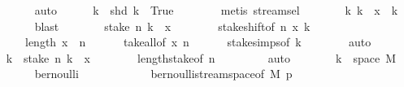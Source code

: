 \begin{isabellebody}
\ \ \ \ \ \ \isamarkupfalse%
\ auto\isanewline
\ \ \ \ \isamarkupfalse%
\ k\ \ {\isachardoublequoteopen}shd\ k\ {\isacharequal}{\kern0pt}\ True{\isachardoublequoteclose}\isanewline
\ \ \ \ \ \ \isamarkupfalse%
\ {\isacharparenleft}{\kern0pt}metis\ stream{\isachardot}{\kern0pt}sel{\isacharparenleft}{\kern0pt}{}{\isacharparenright}{\kern0pt}{\isacharparenright}{\kern0pt}\isanewline
\ \ \ \ \isamarkupfalse%
\ \isamarkupfalse%
\ k{}\ k{}\ {\isacharequal}{\kern0pt}\ x\ {\isacharat}{\kern0pt}{\isacharminus}{\kern0pt}\ k{\isachardoublequoteclose}\isanewline
\ \ \ \ \ \ \isamarkupfalse%
\ blast\isanewline
\ \ \ \ \isamarkupfalse%
\ \isamarkupfalse%
\ {\isachardoublequoteopen}stake\ n\ k{}\ {\isacharequal}{\kern0pt}\ x{\isachardoublequoteclose}\isanewline
\ \ \ \ \ \ \isamarkupfalse%
\ stake{\isacharunderscore}{\kern0pt}shift{\isacharbrackleft}{\kern0pt}of\ n\ x\ k{\isacharbrackright}{\kern0pt}\isanewline
\ \ \ \ \ \ {\isacartoucheopen}length\ x\ {\isacharequal}{\kern0pt}\ n{\isacartoucheclose}\isanewline
\ \ \ \ \ \ take{\isacharunderscore}{\kern0pt}all{\isacharbrackleft}{\kern0pt}of\ x\ n{\isacharbrackright}{\kern0pt}\isanewline
\ \ \ \ \ \ stake{\isachardot}{\kern0pt}simps{\isacharparenleft}{\kern0pt}{}{\isacharparenright}{\kern0pt}{\isacharbrackleft}{\kern0pt}of\ k{\isacharbrackright}{\kern0pt}\isanewline
\ \ \ \ \ \ \isamarkupfalse%
\ auto\isanewline
\ \ \ \ \isamarkupfalse%
\ \isamarkupfalse%
\ k{}\ \ {\isachardoublequoteopen}stake\ n\ k{}\ {\isacharequal}{\kern0pt}\ x{\isachardoublequoteclose}\isanewline
\ \ \ \ \ \ \isamarkupfalse%
\ length{\isacharunderscore}{\kern0pt}stake{\isacharbrackleft}{\kern0pt}of\ n\ {\isacharunderscore}{\kern0pt}{\isacharbrackright}{\kern0pt}\isanewline
\ \ \ \ \ \ \isamarkupfalse%
\ auto\isanewline
\ \ \ \ \isamarkupfalse%
\ \isamarkupfalse%
\ {\isachardoublequoteopen}k{}\ {\isasymin}\ space\ M{\isachardoublequoteclose}\isanewline
\ \ \ \ \ \ \isamarkupfalse%
\ bernoulli\isanewline
\ \ \ \ \ \ \ \ \ \ \ \ bernoulli{\isacharunderscore}{\kern0pt}stream{\isacharunderscore}{\kern0pt}space{\isacharbrackleft}{\kern0pt}of\ M\ p{\isacharbrackright}{\kern0pt}\isanewline
\ \ \ \ \ \ \isamarkupfalse%

\end{isabellebody}
